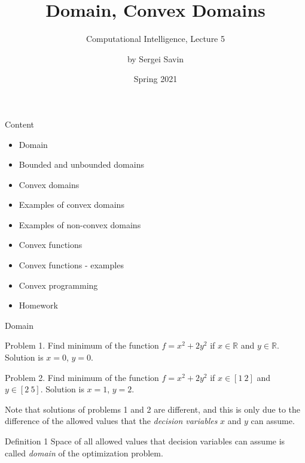 \documentclass{beamer}
\title{Domain, Convex Domains}
\subtitle{Computational Intelligence, Lecture 5}
\author{by Sergei Savin}
\date{Spring 2021}
\begin{document}
\maketitle


\begin{frame}{Content}

\begin{itemize}
\item Domain
\item Bounded and unbounded domains
\item Convex domains
\item Examples of convex domains
\item Examples of non-convex domains
\item Convex functions
\item Convex functions - examples
\item Convex programming
\item Homework
\end{itemize}

\end{frame}



\begin{frame}{Domain}
\begin{flushleft}

Problem 1. Find minimum of the function $f = x^2 + 2y^2$ if $x \in \mathbb{R}$ and $y \in \mathbb{R}$. Solution is $x = 0$, $y = 0$.

\bigskip

Problem 2. Find minimum of the function $f = x^2 + 2y^2$ if $x \in [1 \ 2]$ and $y \in [2 \ 5]$. Solution is $x = 1$, $y = 2$.

\bigskip

Note that solutions of problems 1 and 2 are different, and this is only due to the difference of the allowed values that the \emph{decision variables} $x$ and $y$ can assume.

\begin{block}{Definition 1}
Space of all allowed values that decision variables can assume is called \emph{domain} of the optimization problem.
\end{block}
 
\end{flushleft}
\end{frame}
\end{document}
